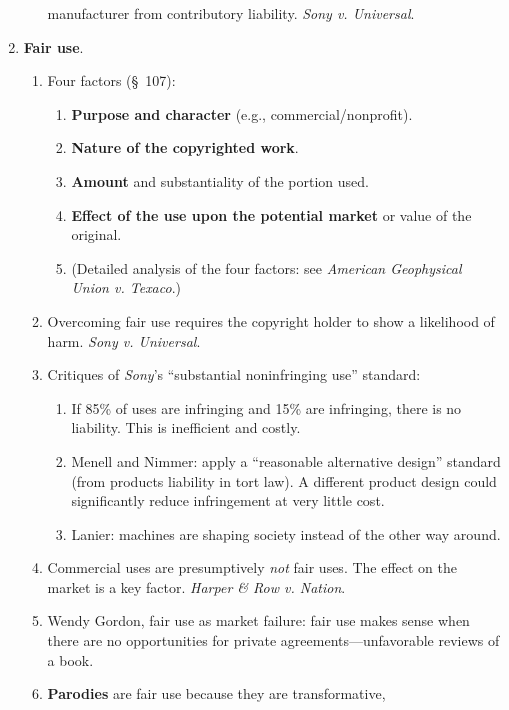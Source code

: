 \begin{enumerate}
\begin{enumerate}
        manufacturer from contributory liability. \emph{Sony v. Universal}.
    \end{enumerate}
    \item \textbf{Fair use}.
    \begin{enumerate}
        \item Four factors (\S\ 107):
        \begin{enumerate}
            \item \textbf{Purpose and character} (e.g., commercial/nonprofit).
            \item \textbf{Nature of the copyrighted work}.
            \item \textbf{Amount} and substantiality of the portion used.
            \item \textbf{Effect of the use upon the potential market} or 
            value of the original.
            \item (Detailed analysis of the four factors: see \emph{American 
            Geophysical Union v. Texaco}.)
        \end{enumerate}
        \item Overcoming fair use requires the copyright holder to show a 
        likelihood of harm. \emph{Sony v. Universal}.
        \item Critiques of \emph{Sony}'s ``substantial noninfringing use''
        standard:
        \begin{enumerate}
            \item If 85\% of uses are infringing and 15\% are infringing, 
            there is no liability. This is inefficient and costly.
            \item Menell and Nimmer: apply a ``reasonable alternative design'' 
            standard (from products liability in tort law). A different 
            product design could significantly reduce infringement at very 
            little cost.
            \item Lanier: machines are shaping society instead of the other 
            way around.
        \end{enumerate}
        \item Commercial uses are presumptively \emph{not} fair uses. The 
        effect on the market is a key factor. \emph{Harper \& Row v. Nation}.
        \item Wendy Gordon, fair use as market failure: fair use makes sense 
        when there are no opportunities for private agreements---unfavorable 
        reviews of a book.
        \item \textbf{Parodies} are fair use because they are transformative, 

\end{enumerate}
\end{enumerate}

